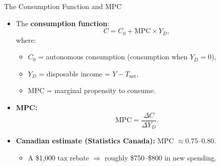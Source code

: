 \documentclass[aspectratio=169]{beamer}
\begin{document}
\begin{frame}{The Consumption Function and MPC}
\transfade
\begin{itemize}
  \item The \textbf{consumption function}:
  \[
    C = C_0 + \text{MPC} \times Y_D,
  \]
  where:
  \begin{itemize}
    \item $C_0$ = autonomous consumption (consumption when $Y_D = 0$),
    \item $Y_D$ = disposable income = $Y - T_{\text{net}}$,
    \item $\text{MPC}$ = marginal propensity to consume.
  \end{itemize}
  \item \textbf{MPC:}
  \[
    \text{MPC} = \frac{\Delta C}{\Delta Y_D}.
  \]
  \item \textbf{Canadian estimate (Statistics Canada):} MPC $\approx 0.75$--$0.80$.
  \begin{itemize}
    \item A \$1{,}000 tax rebate $\Rightarrow$ roughly \alert{\$750--\$800} in new spending.
  \end{itemize}
\end{itemize}
\end{frame}
\end{document}
